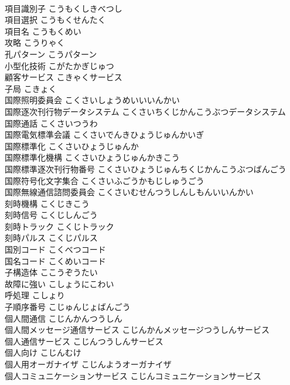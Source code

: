 \documentclass[8pt]{extreport}
\begin{document}
\begin{CJK}{UTF8}{min}
\\	項目識別子	こうもくしきべつし	
\\	項目選択	こうもくせんたく	
\\	項目名	こうもくめい	
\\	攻略	こうりゃく	
\\	孔パターン	こうパターン	
\\	小型化技術	こがたかぎじゅつ	
\\	顧客サービス	こきゃくサービス	
\\	子局	こきょく	
\\	国際照明委員会	こくさいしょうめいいいんかい	
\\	国際逐次刊行物データシステム	こくさいちくじかんこうぶつデータシステム	
\\	国際通話	こくさいつうわ	
\\	国際電気標準会議	こくさいでんきひょうじゅんかいぎ	
\\	国際標準化	こくさいひょうじゅんか	
\\	国際標準化機構	こくさいひょうじゅんかきこう	
\\	国際標準逐次刊行物番号	こくさいひょうじゅんちくじかんこうぶつばんごう	
\\	国際符号化文字集合	こくさいふごうかもじしゅうごう	
\\	国際無線通信諮問委員会	こくさいむせんつうしんしもんいいんかい	
\\	刻時機構	こくじきこう	
\\	刻時信号	こくじしんごう	
\\	刻時トラック	こくじトラック	
\\	刻時パルス	こくじパルス	
\\	国別コード	こくべつコード	
\\	国名コード	こくめいコード	
\\	子構造体	ここうぞうたい	
\\	故障に強い	こしょうにこわい	
\\	呼処理	こしょり	
\\	子順序番号	こじゅんじょばんごう	
\\	個人間通信	こじんかんつうしん	
\\	個人間メッセージ通信サービス	こじんかんメッセージつうしんサービス	
\\	個人通信サービス	こじんつうしんサービス	
\\	個人向け	こじんむけ	
\\	個人用オーガナイザ	こじんようオーガナイザ	
\\	個人コミュニケーションサービス	こじんコミュニケーションサービス	

\end{CJK}
\end{document}
